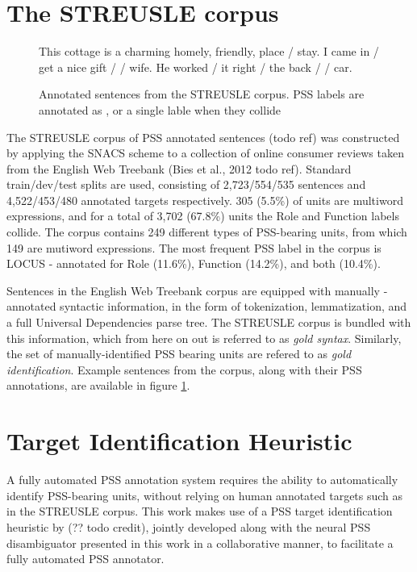 \section{The STREUSLE corpus}\label{sec:streusle}

\begin{figure}
\begin{exe}\raggedright
\ex This cottage is a charming homely, friendly, place / stay.
\ex I came in / get a nice gift / / wife.
\ex He worked / it right / the back / / car.
\end{exe}
\caption{Annotated sentences from the STREUSLE corpus. PSS labels are annotated as , or a single lable when they collide}
\label{fig:streuslesamples}
\end{figure}


The STREUSLE corpus of PSS annotated sentences (todo ref) was constructed by applying the SNACS scheme to a collection of online consumer reviews taken from the English Web Treebank (Bies et al., 2012 todo ref). Standard train/dev/test splits are used, consisting of 2,723/554/535 sentences and 4,522/453/480 annotated targets respectively. 305 (5.5\%) of units  are multiword expressions, and for a total of 3,702 (67.8\%) units the Role and Function labels collide. The corpus contains 249 different types of PSS-bearing units, from which 149 are mutiword expressions. The most frequent PSS label in the corpus is LOCUS - annotated for Role (11.6\%), Function (14.2\%), and both (10.4\%).

Sentences in the English Web Treebank corpus are equipped with manually -annotated syntactic information, in the form of tokenization, lemmatization, and a full Universal Dependencies parse tree. The STREUSLE corpus is bundled with this information, which from here on out is referred to as \emph{gold syntax}. Similarly, the set of manually-identified PSS bearing units are refered to as \emph{gold identification}. Example sentences from the corpus, along with their PSS annotations, are available in figure \ref{fig:streuslesamples}.

\section{Target Identification Heuristic} \label{sec:ident}

A fully automated PSS annotation system requires the ability to automatically identify PSS-bearing units, without relying on human annotated targets such as in the STREUSLE corpus. This work makes use of a PSS target identification heuristic by (?? todo credit), jointly developed along with the neural PSS disambiguator presented in this work in a collaborative manner, to facilitate a fully automated PSS annotator. 

